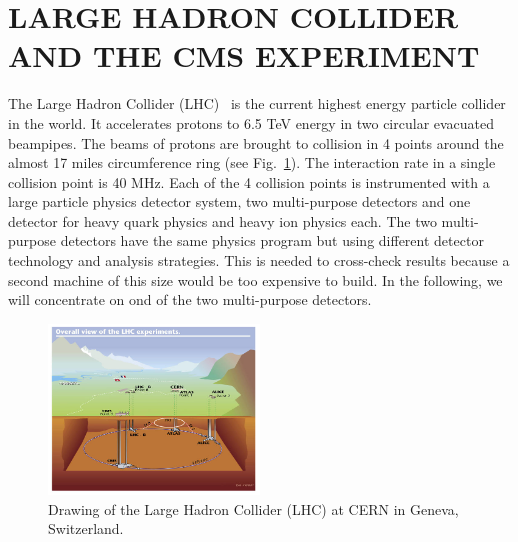 \documentclass{wscpaperproc}
\theoremstyle{wsc}
\begin{document}
\section{LARGE HADRON COLLIDER AND THE CMS EXPERIMENT}
\label{sec:lhc}

The Large Hadron Collider (LHC)~ is the current highest energy particle collider in the world. It accelerates protons to 6.5 TeV energy in two circular evacuated beampipes. The beams of protons are brought to collision in 4 points around the almost 17 miles circumference ring (see Fig.~\ref{fig:lhc}). The interaction rate in a single collision point is 40 MHz. Each of the 4 collision points is instrumented with a large particle physics detector system, two multi-purpose detectors and one detector for heavy quark physics and heavy ion physics each. The two multi-purpose detectors have the same physics program but using different detector technology and analysis strategies. This is needed to cross-check results because a second machine of this size would be too expensive to build. In the following, we will concentrate on ond of the two multi-purpose detectors.

\begin{figure}[htb]
{
   \centering
   \includegraphics[width=0.50\textwidth]{lhc}
   \caption{Drawing of the Large Hadron Collider (LHC) at CERN in Geneva, Switzerland.
   \label{fig:lhc}}
}
\end{figure}
\end{document}
